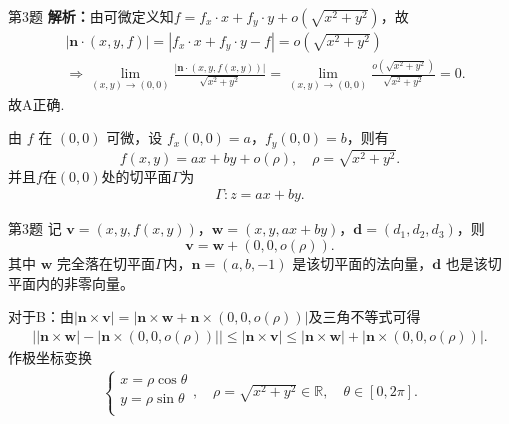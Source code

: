 \documentclass[aspectratio=169]{beamer}
\begin{document}
\begin{frame}{第3题}
\textbf{解析：}由可微定义知$f=f_x\cdot x+f_y\cdot y+o\left(\sqrt{x^2+y^2}\right)$，故
\begin{align*}
&\left| \boldsymbol{n}\cdot \left( x,y,f \right) \right|=\left| f_x\cdot x+f_y\cdot y-f \right|=o\left( \sqrt{x^2+y^2} \right) 
\\
&\Longrightarrow \lim_{(x,y)\rightarrow (0,0)} \frac{|\boldsymbol{n}\cdot (x,y,f(x,y))|}{\sqrt{x^2+y^2}}=\lim_{(x,y)\rightarrow (0,0)} \frac{o\left( \sqrt{x^2+y^2} \right)}{\sqrt{x^2+y^2}}=0.
\end{align*}
故A正确.

由 $f$ 在 $(0,0)$ 可微，设 $f_x(0,0)=a$，$f_y(0,0)=b$，则有
\[
f(x,y)=ax+by+o(\rho),\quad \rho=\sqrt{x^2+y^2}.
\]
并且$f$在$(0,0)$处的切平面$\Gamma$为
\begin{align*}
\Gamma: z = ax+by.
\end{align*}
\end{frame}

\begin{frame}{第3题}
记 $\boldsymbol{v}=(x,y,f(x,y))$，$\boldsymbol{w}=(x,y,ax+by)$，$\boldsymbol{d}=(d_1,d_2,d_3)$，则
\[
\boldsymbol{v}=\boldsymbol{w}+(0,0,o(\rho)).
\]
其中 $\boldsymbol{w}$ 完全落在切平面$\Gamma$内，$\boldsymbol{n}=(a,b,-1)$ 是该切平面的法向量，$\boldsymbol{d}$ 也是该切平面内的非零向量。

对于B：由$\left| \boldsymbol{n}\times \boldsymbol{v} \right|=\left| \boldsymbol{n}\times \boldsymbol{w}+\boldsymbol{n}\times \left( 0,0,o\left( \rho \right) \right) \right|
$及三角不等式可得
\begin{align*}
\left| \left| \boldsymbol{n}\times \boldsymbol{w} \right|-\left| \boldsymbol{n}\times \left( 0,0,o\left( \rho \right) \right) \right| \right|\leqslant \left| \boldsymbol{n}\times \boldsymbol{v} \right|\leqslant \left| \boldsymbol{n}\times \boldsymbol{w} \right|+\left| \boldsymbol{n}\times \left( 0,0,o\left( \rho \right) \right) \right|.
\end{align*}
作极坐标变换
\begin{align*}
\begin{cases}
x=\rho \cos \theta\\
y=\rho \sin \theta\\
\end{cases},\quad \rho =\sqrt{x^2+y^2}\in \mathbb{R} ,\quad \theta \in \left[ 0,2\pi \right].
\end{align*}
\end{frame}
\end{document}
